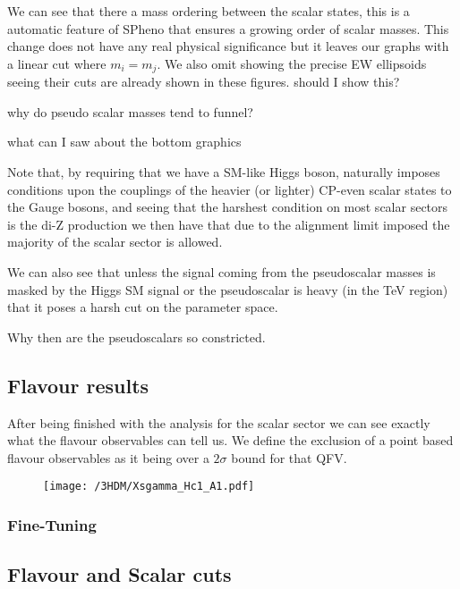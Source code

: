 We can see that there a mass ordering between the scalar states, this is a automatic feature of SPheno that ensures a growing order of scalar masses. This change does not have any real physical significance but it leaves our graphs with a linear cut where $m_i = m_j$. 
%
We also omit showing the precise EW ellipsoids seeing their cuts are already shown in these figures. { \color{red} should I show this? } 

{ \color{red} why do pseudo scalar masses tend to funnel? } 

{ \color{red} what can I saw about the bottom graphics    } 

Note that, by requiring that we have a SM-like Higgs boson, naturally imposes conditions upon the couplings of the heavier (or lighter) CP-even scalar states to the Gauge bosons, and seeing that the harshest condition on most scalar sectors is the di-Z production we then have that due to the alignment limit imposed the majority of the scalar sector is allowed. 

We can also see that unless the signal coming from the pseudoscalar masses is masked by the Higgs SM signal or the pseudoscalar is heavy (in the TeV region) that it poses a harsh cut on the parameter space.

 { \color{red} Why then are the pseudoscalars so constricted. }   


\subsection{Flavour results}

After being finished with the analysis for the scalar sector we can see exactly what the flavour observables can tell us. We define the exclusion of a point based flavour observables as it being over a $2 \sigma$ bound for that QFV.  




\begin{figure}[H]
	\centering
	\texttt{[image: /3HDM/Xsgamma\_Hc1\_A1.pdf]}
	\caption{}
	\label{fig:STU_2}
\end{figure}	

\subsubsection{Fine-Tuning}


\subsection{Flavour and Scalar cuts }

